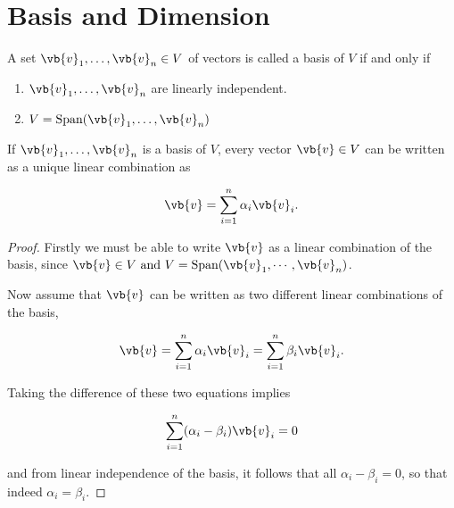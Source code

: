 \documentclass[a4paper,12pt]{report}
\begin{document}
\section{Basis and Dimension}
\begin{definition}
A set \(\vb{v} _{1}, \ldots , \vb{v} _{n} \in V \) of vectors is called a basis of \(V\) if and only if 

\begin{enumerate}[label=(C\arabic*)] \label{basis} 
    \item \(\vb{v} _{1}, \ldots , \vb{v} _{n}  \) are linearly independent.
    \item \(V = \text{Span}(\vb{v} _{1}, \ldots , \vb{v} _{n}  ) \)  
\end{enumerate}
\end{definition}

\begin{lemma} \label{uniquelinear} 
If \(\vb{v} _{1}, \ldots ,\vb{v} _{n}  \) is a basis of \(V\), every vector \(\vb{v} \in V\) can be written as a unique linear combination as

\begin{equation}
    \vb{v} = \sum_{i=1}^{n} \alpha _{i} \vb{v} _{i}  .
\end{equation}

\end{lemma}

\begin{proof}
Firstly we must be able to write \(\vb{v} \) as a linear combination of the basis, since \(\vb{v} \in V \text { and } V = \text{Span} (\vb{v}_1, \cdots, \vb{v}_n ) \).   

Now assume that \(\vb{v} \) can be written as two different linear combinations of the basis, \ie 

\begin{equation}
    \vb{v} = \sum_{i=1}^{n} \alpha _{i}\vb{v} _{i} = \sum_{i=1}^{n} \beta _{i} \vb{v} _{i}.  
\end{equation}

Taking the difference of these two equations implies

\begin{equation}
    \sum_{i=1}^{n} (\alpha _{i} - \beta _{i}  )\vb{v} _{i} =0
\end{equation}

and from linear independence of the basis, it follows that all \(\alpha _{i} - \beta _{i} = 0  \), so that indeed \(\alpha _{i} = \beta _{i}  \). 
\end{proof}
\end{document}

